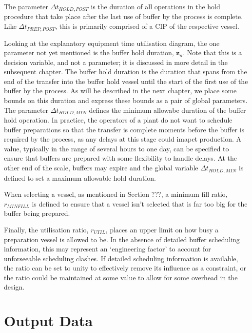 The parameter $\Delta t_{\mathit{HOLD,POST}}$ is the duration of all operations
in the hold procedure that take place after the last use of buffer by the
process is complete.
Like $\Delta t_{\mathit{PREP,POST}}$, this is primarily comprised of a CIP of
the respective vessel.

Looking at the explanatory equipment time utilisation diagram, the one
parameter not yet mentioned is the buffer hold duration, $\boldsymbol{z}_{n}$.
Note that this is a decision variable, and not a parameter; it is discussed in
more detail in the subsequent chapter.
The buffer hold duration is the duration that spans from the end of the
transfer into the buffer hold vessel until the start of the first use of the
buffer by the process.
As will be described in the next chapter, we place some bounds on this duration
and express these bounds as a pair of global parameters.
The parameter $\Delta t_{\mathit{HOLD,MIN}}$ defines the minimum allowabe
duration of the buffer hold operation.
In practice, the operators of a plant do not want to schedule buffer
preparations so that the transfer is complete moments before the buffer is
required by the process, as any delays at this stage could imapct production.
A value, typically in the range of several hours to one day, can be specified
to ensure that buffers are prepared with some flexibility to handle delays.
At the other end of the scale, buffers may expire and the global variable 
$\Delta t_{\mathit{HOLD,MIN}}$ is defined to set a maximum allowable hold
duration.

When selecting a vessel, as mentioned in Section ???, a minimum fill ratio,
$r_{\mathit{MINFILL}}$ is defined to ensure that a vessel isn't selected that
is far too big for the buffer being prepared.

Finally, the utilisation ratio, $r_{\mathit{UTIL}}$, places an upper limit on
how busy a preparation vessel is allowed to be.
In the absence of detailed buffer scheduling information, this may represent an
`engineering factor' to account for unforseeable scheduling clashes.
If detailed scheduling information is available, the ratio can be set to unity
to effectively remove its influence as a constraint, or the ratio could be
maintained at some value to allow for some overhead in the design.

\section{Output Data}\label{S.outputdata}

